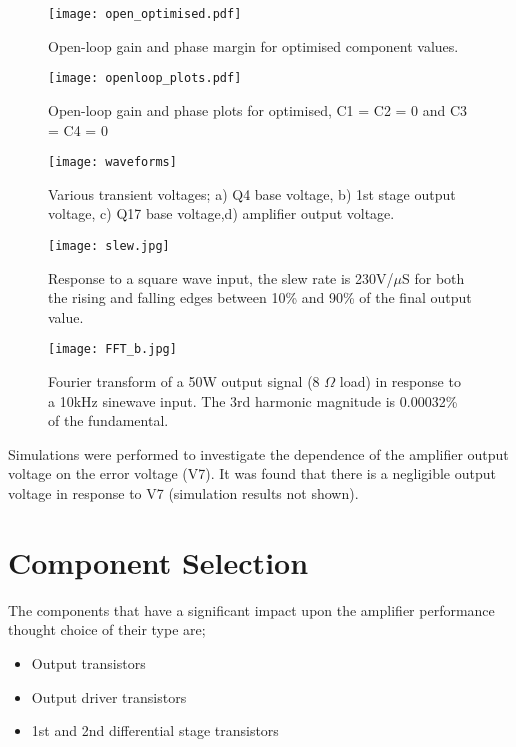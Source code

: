 \documentclass[a4paper,10pt, oneside]{article}
\begin{document}
\begin{figure}[H]
\begin{centering}
	\texttt{[image: open\_optimised.pdf]}
	\caption{Open-loop gain and phase margin for optimised component values.}\label{optimised}
\end{centering}	
\end{figure}

\begin{figure}[H]
\begin{centering}
  \texttt{[image: openloop\_plots.pdf]}
  \caption{Open-loop gain and phase plots for optimised, C1 = C2 = 0 and C3 = C4 = 0}\label{C8}
\end{centering}
\end{figure}

\begin{figure}[H]
\begin{centering}
  \texttt{[image: waveforms]}
  \caption{Various transient voltages; a) Q4 base voltage, b) 1st stage output voltage, c) Q17 base voltage,\newline d) amplifier output voltage.}\label{waveforms}
\end{centering}  
\end{figure}

\begin{figure}[H]
  \texttt{[image: slew.jpg]}
  \caption{Response to a square wave input, the slew rate is 230V/$\mu$S for both the rising and falling edges between 10\% and 90\% 
  of the final output value.}
  \label{slew}
\end{figure}

\begin{figure}[H]
  \texttt{[image: FFT\_b.jpg]}
  \caption{Fourier transform of a 50W output signal (8 $\Omega$ load) in response to a 10kHz sinewave input. The 3rd harmonic magnitude is 0.00032\% of the fundamental.}\label{fft}
\end{figure}
Simulations were performed to investigate the dependence of the amplifier output voltage on the error voltage (V7). It was found that there is a negligible output voltage in response to V7 (simulation results not shown). 

\section{Component Selection}
The components that have a significant impact upon the amplifier performance thought choice of their type are;
\begin{itemize}
	\item Output transistors
	\item Output driver transistors
	\item 1st and 2nd differential stage transistors
\end{itemize}
\end{document}
